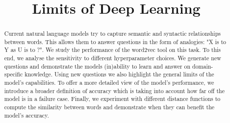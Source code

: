 \documentclass[conference]{IEEEtran}
\begin{document}
%
\title{Limits of Deep Learning}


\author{
\and
{}
}


\maketitle

\begin{abstract}
Current natural language models try to capture semantic and syntactic relationships between words.
This allows them to answer questions in the form of analogies: "X is to Y as U is to ?".
We study the performance of the word2vec tool on this task. To this end, we analyse the sensitivity to different hyperparameter choices.
We generate new questions and demonstrate the models (in)ability to learn and answer on domain-specific knowledge. Using new questions we also highlight the general limits of the model's capabilities.
To offer a more detailed view of the model's performance, we introduce a broader definition of accuracy which is taking into account how far off the model is in a failure case. Finally, we experiment with different distance functions to compute the similarity between words and demonstrate when they can benefit the model's accuracy.


\end{abstract}



%
\IEEEpeerreviewmaketitle
\end{document}

